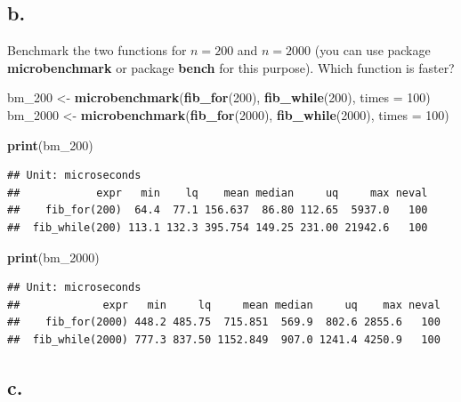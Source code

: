 \documentclass[
]{article}
\newenvironment{Shaded}{\begin{snugshade}}{\end{snugshade}}
\newcommand{\AttributeTok}[1]{\textcolor[rgb]{0.13,0.29,0.53}{#1}}
\newcommand{\DecValTok}[1]{\textcolor[rgb]{0.00,0.00,0.81}{#1}}
\newcommand{\FunctionTok}[1]{\textcolor[rgb]{0.13,0.29,0.53}{\textbf{#1}}}
\newcommand{\NormalTok}[1]{#1}
\newcommand{\OtherTok}[1]{\textcolor[rgb]{0.56,0.35,0.01}{#1}}
\begin{document}
\subsection{b.}\label{b.}

Benchmark the two functions for \(n=200\) and \(n=2000\) (you can use
package \textbf{microbenchmark} or package \textbf{bench} for this
purpose). Which function is faster?

\begin{Shaded}
\begin{Highlighting}[]
\NormalTok{bm\_200 }\OtherTok{\textless{}{-}} \FunctionTok{microbenchmark}\NormalTok{(}\FunctionTok{fib\_for}\NormalTok{(}\DecValTok{200}\NormalTok{), }\FunctionTok{fib\_while}\NormalTok{(}\DecValTok{200}\NormalTok{), }\AttributeTok{times =} \DecValTok{100}\NormalTok{)}
\NormalTok{bm\_2000 }\OtherTok{\textless{}{-}} \FunctionTok{microbenchmark}\NormalTok{(}\FunctionTok{fib\_for}\NormalTok{(}\DecValTok{2000}\NormalTok{), }\FunctionTok{fib\_while}\NormalTok{(}\DecValTok{2000}\NormalTok{), }\AttributeTok{times =} \DecValTok{100}\NormalTok{)}

\FunctionTok{print}\NormalTok{(bm\_200)}
\end{Highlighting}
\end{Shaded}

\begin{verbatim}
## Unit: microseconds
##            expr   min    lq    mean median     uq     max neval
##    fib_for(200)  64.4  77.1 156.637  86.80 112.65  5937.0   100
##  fib_while(200) 113.1 132.3 395.754 149.25 231.00 21942.6   100
\end{verbatim}

\begin{Shaded}
\begin{Highlighting}[]
\FunctionTok{print}\NormalTok{(bm\_2000)}
\end{Highlighting}
\end{Shaded}

\begin{verbatim}
## Unit: microseconds
##             expr   min     lq     mean median     uq    max neval
##    fib_for(2000) 448.2 485.75  715.851  569.9  802.6 2855.6   100
##  fib_while(2000) 777.3 837.50 1152.849  907.0 1241.4 4250.9   100
\end{verbatim}

\subsection{c.}\label{c.}
\end{document}
